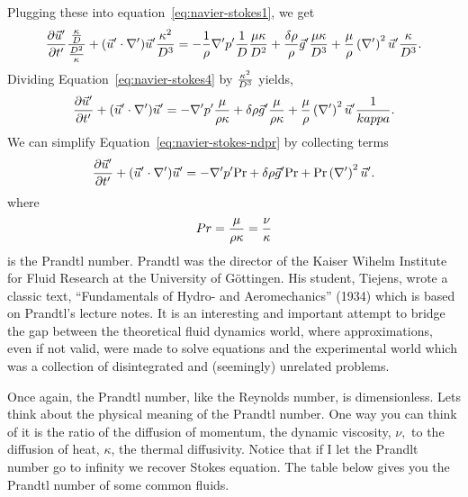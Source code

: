 \documentclass[12pt,twoside]{article}
\begin{document}
Plugging these into equation~\ref{eq:navier-stokes1}, we get
\begin{equation}      
{{\partial \vec u^\prime} \over {\partial t^\prime}}
{{\kappa\over D}\over{D^2\over \kappa}}
+ (\vec u^\prime \cdot \nabla^\prime ) \vec u^\prime {{\kappa^2}\over D^3}  =
-{1\over\rho}\nabla^\prime p^\prime {1\over D} {{\mu\kappa}\over D^2} +
{{\delta\rho}\over\rho}\vec g^\prime {{\mu \kappa}\over D^3} + {\mu\over\rho}
\left (\nabla^\prime \right )^2 \vec u^\prime {\kappa\over D^3}.
\label{eq:navier-stokes4}
\end{equation} 
Dividing Equation~\ref{eq:navier-stokes4} by $\kappa^2\over D^3$ yields,
\begin{equation}       
{{\partial \vec u^\prime} \over {\partial t^\prime}}
 + ( \vec u^\prime \cdot \nabla^\prime ) \vec u^\prime   = 
-\nabla^\prime p^\prime {\mu \over {\rho \kappa}}  + 
\delta\rho \vec g^\prime {\mu \over {\rho \kappa}}  + 
{\mu\over\rho} \left (\nabla^\prime \right )^2 \vec u^\prime {1\over {kappa}}.
\label{eq:navier-stokes-ndpr}
\end{equation} 
We can simplify Equation~\ref{eq:navier-stokes-ndpr} by collecting terms
\begin{equation}         
{{\partial \vec u^\prime} \over {\partial t^\prime}} + ( \vec u^\prime \cdot
\nabla^\prime ) \vec u^\prime   =  -\nabla^\prime p^\prime {\rm Pr}   
+ \delta\rho \vec g^\prime {\rm Pr} + 
{\rm Pr} \left (\nabla^\prime \right )^2 \vec u^\prime.
\label{eq:navier-stokes-nd2pr}
\end{equation} 
where
\begin{equation} 
Pr = {\mu\over{\rho\kappa}} = {\nu \over \kappa}
\end{equation} 
is the Prandtl number.  Prandtl was the director of the Kaiser Wihelm Institute
for Fluid Research at the University of G\"ottingen.   His student, Tiejens,
wrote a classic text, ``Fundamentals of Hydro- and Aeromechanics'' (1934) which
is based on Prandtl's lecture notes.  It is an interesting and important
attempt to bridge the gap between the theoretical fluid dynamics world, where
approximations, even if not valid, were made to solve equations and the
experimental world which was a collection of disintegrated and
(seemingly) unrelated problems.  

Once again, the Prandtl number, like the Reynolds number, is dimensionless. Lets
think about the physical meaning of the Prandtl number.  One way you can think
of it is the ratio of the diffusion of momentum, the dynamic viscosity,
$\nu,$ to the diffusion of heat, $\kappa$, the thermal diffusivity.  Notice that
if I let the Prandlt number go to infinity we recover Stokes equation.  The
table below gives you the Prandtl number of some common fluids.
\end{document}
